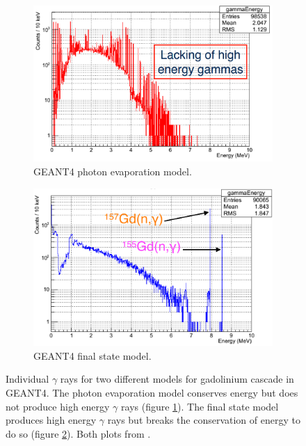 \begin{figure}[!h]
\centering
\begin{subfigure}{.5\textwidth}
  \centering
  \includegraphics[width=\linewidth]{Chapter4/Figs/Raster/gadolinium/photonEvaporationGd.png}
  \captionsetup{width=.9\linewidth}
  \caption{GEANT4 photon evaporation model.}
  \label{subFig:differentGEANT4Models_photonEvaporationGd}
\end{subfigure}%
\begin{subfigure}{.5\textwidth}
  \centering
  \includegraphics[width=\linewidth]{Chapter4/Figs/Raster/gadolinium/FinalStateGd.png}
  \captionsetup{width=.9\linewidth}
  \caption{GEANT4 final state model.}
  \label{subFig:differentGEANT4Models_finalStateGd}
\end{subfigure}
\caption{Individual $\gamma$ rays for two different models for gadolinium cascade in GEANT4. The photon evaporation model conserves energy but does not produce high energy $\gamma$ rays (figure \ref{subFig:differentGEANT4Models_photonEvaporationGd}). The final state model produces high energy $\gamma$ rays but breaks the conservation of energy to do so (figure \ref{subFig:differentGEANT4Models_finalStateGd}). Both plots from \cite{YuChen_2015}.}
\label{fig:differentGEANT4Models}
\end{figure}

